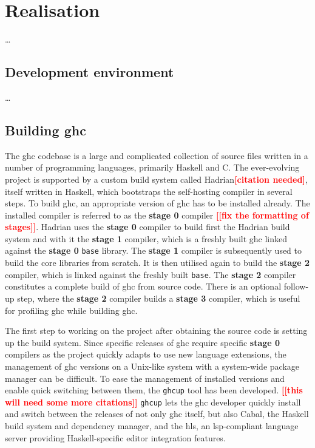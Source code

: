 \documentclass[thesis=B,english]{FITthesis}[2019/12/23]
\newcommand{\todo}[1]{\textcolor{red}{\textbf{[[#1]]}}}
\newcommand{\citationNeeded}{\textcolor{red}{\textbf{[citation needed]}}}
\newcommand{\hackage}[1]{\texttt{#1}}
\begin{document}
\chapter{Realisation}
\ldots

\section{Development environment}
\ldots

\section{Building \acrshort{ghc}}

The \acrshort{ghc} codebase is a large and complicated collection of source
files written in a number of programming languages, primarily Haskell and
C\cite{arch-ghc}. The ever-evolving project is supported by a custom build
system called Hadrian\citationNeeded, itself written in Haskell, which
bootstraps the self-hosting compiler in several steps. To build \acrshort{ghc},
an appropriate version of \acrshort{ghc} has to be installed already. The
installed compiler is referred to as the \textbf{stage 0} compiler \todo{fix
the formatting of stages}. Hadrian uses the \textbf{stage 0} compiler to build
first the Hadrian build system and with it the \textbf{stage 1} compiler, which
is a freshly built \acrshort{ghc} linked against the \textbf{stage 0}
\hackage{base} library. The \textbf{stage 1} compiler is subsequently used to
build the core libraries from scratch. It is then utilised again to build the
\textbf{stage 2} compiler, which is linked against the freshly built
\hackage{base}. The \textbf{stage 2} compiler constitutes a complete build of
\acrshort{ghc} from source code. There is an optional follow-up step, where the
\textbf{stage 2} compiler builds a \textbf{stage 3} compiler, which is useful
for profiling \acrshort{ghc} while building \acrshort{ghc}.

The first step to working on the project after obtaining the source code is
setting up the build system. Since specific releases of \acrshort{ghc} require
specific \textbf{stage 0} compilers as the project quickly adapts to use new
language extensions, the management of \acrshort{ghc} versions on a Unix-like
system with a system-wide package manager can be difficult. To ease the
management of installed versions and enable quick switching between them, the
\texttt{ghcup} tool\cite{ghcup} has been developed. \todo{this will need some
more citations} \texttt{ghcup} lets the \acrshort{ghc} developer quickly
install and switch between the releases of not only \acrshort{ghc} itself, but
also Cabal, the Haskell build system and dependency manager, and the
\acrfull{hls}, an \acrshort{lsp}-compliant language server providing
Haskell-specific editor integration features.
\end{document}
